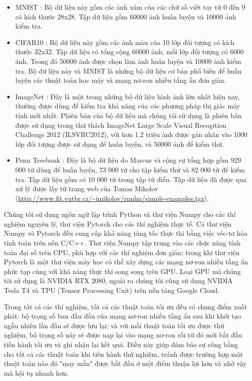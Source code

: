 \begin{itemize}
	\item MNIST \cite{lecun2010mnist}: Bộ dữ liệu này gồm các ảnh xám của các chữ số viết tay từ 0 đến 9 có kích thước 28x28. Tập dữ liệu gồm 60000 ảnh huấn luyện và 10000 ảnh kiểm tra.
	\item CIFAR10 \cite{krizhevsky2009cifar10}: Bộ dữ liệu này gồm các ảnh màu của 10 lớp đối tượng có kích thước 32x32. Tập dữ liệu có tổng cộng 60000 ảnh, mỗi lớp đối tượng có 6000 ảnh. Trong đó 50000 ảnh được chọn làm ảnh huấn luyện và 10000 ảnh kiểm tra. Bộ dữ liệu này và MNIST là những bộ dữ liệu cơ bản phổ biến để huấn luyện các thuật toán học máy và mạng nơ-ron nhiều tẩng ẩn đơn giản.
	\item ImageNet \cite{deng2009imagenet}: Đây là một trong những bộ dữ liệu hình ảnh lớn nhất hiện nay, thường được dùng để kiểm tra khả năng của các phương pháp thị giác máy tính mới nhất. Phiên bản của bộ dữ liệu mà chúng tôi sử dụng là phiên bản được sử dụng trong thử thách ImageNet Large Scale Visual Recogition Challenge 2012 (ILSVRC2012), với hơn 1.2 triệu ảnh được gán nhãn vào 1000 lớp đối tượng được sử dụng để huấn luyện, và 50000 ảnh để kiểm thử.
	\item Penn Treebank \cite{marcus1993ptb}: Đây là bộ dữ liệu do Marcus và cộng sự tổng hợp gồm 929 000 từ dùng để huấn luyện, 73 000 từ cho tập kiểm thử và 82 000 từ để kiểm tra. Tập dữ liệu gồm có 10 000 từ trong tập từ điển. Tập dữ liệu đã được qua xử lý được lấy từ trang web của Tomas Mikolov (\url{http://www.fit.vutbr.cz/~imikolov/rnnlm/simple-examples.tgz}).
\end{itemize}

Chúng tôi sử dụng ngôn ngữ lập trình Python và thư viện Numpy cho các thí nghiệm nguyên lý, thư viện Pytorch cho các thí nghiệm thực tế. Cả thư viện Numpy và Pytorch đều cung cấp khả năng tăng tốc thực thi bằng việc véc-tơ hóa tính toán trên nền C/C++. Thư viện Numpy tập trung vào các chức năng tính toán đại số trên CPU, phù hợp với các thí nghiệm đơn giản; trong khi thư viện Pytorch là một thư viện máy học có thể xây dựng các mạng nơ-ron nhiều tầng ẩn phức tạp cùng với khả năng thực thi song song trên GPU. Loại GPU mà chúng tôi sử dụng là NVIDIA RTX 2080, ngoài ra chúng tôi cũng sử dụng NVIDIA Tesla T4 và TPU (Tensor Processing Unit) trên nền tảng Google Cloud.

Trong tất cả các thí nghiệm, tất cả các thuật toán tối ưu đều có chung điểm xuất phát: bộ trọng số ban đầu đầu của mạng nơ-ron nhiều tầng ẩn sau khi khởi tạo ngẫu nhiên lần đầu sẽ được lưu lại; và với mỗi thuật toán tối ưu được thử nghiệm, bộ trọng số này sẽ được nạp lại vào mạng nơ-ron rồi từ đó mới bắt đầu tiến hành tối ưu và ghi nhận lại kết quả. Điều này giúp đảm bảo sự công bằng cho tất cả các thuật toán khi tiến hành thử nghiệm, tránh được trường hợp một thuật toán nào đó "may mắn" được bắt đầu ở một điểm thuận lợi hơn và nhờ vậy mà hội tụ nhanh hơn.

